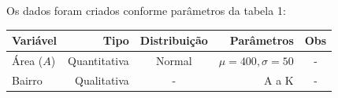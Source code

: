\documentclass[
  a4paper, 11pt]{article}
\begin{document}
Os dados foram criados conforme parâmetros da tabela 1:

\begin{longtable}[]{@{}lrcrc@{}}
\toprule
\begin{minipage}[b]{0.18\columnwidth}\raggedright
Variável\strut
\end{minipage} & \begin{minipage}[b]{0.12\columnwidth}\raggedleft
Tipo\strut
\end{minipage} & \begin{minipage}[b]{0.11\columnwidth}\centering
Distribuição\strut
\end{minipage} & \begin{minipage}[b]{0.25\columnwidth}\raggedleft
Parâmetros\strut
\end{minipage} & \begin{minipage}[b]{0.21\columnwidth}\centering
Obs\strut
\end{minipage}\tabularnewline
\midrule
\endhead
\begin{minipage}[t]{0.18\columnwidth}\raggedright
Área (\(A\))\strut
\end{minipage} & \begin{minipage}[t]{0.12\columnwidth}\raggedleft
Quantitativa\strut
\end{minipage} & \begin{minipage}[t]{0.11\columnwidth}\centering
Normal\strut
\end{minipage} & \begin{minipage}[t]{0.25\columnwidth}\raggedleft
\(\mu = 400, \sigma = 50\)\strut
\end{minipage} & \begin{minipage}[t]{0.21\columnwidth}\centering
-\strut
\end{minipage}\tabularnewline
\begin{minipage}[t]{0.18\columnwidth}\raggedright
Bairro\strut
\end{minipage} & \begin{minipage}[t]{0.12\columnwidth}\raggedleft
Qualitativa\strut
\end{minipage} & \begin{minipage}[t]{0.11\columnwidth}\centering
-\strut
\end{minipage} & \begin{minipage}[t]{0.25\columnwidth}\raggedleft
A a K\strut
\end{minipage} & \begin{minipage}[t]{0.21\columnwidth}\centering
-\strut
\end{minipage}\tabularnewline

\end{longtable}
\end{document}
